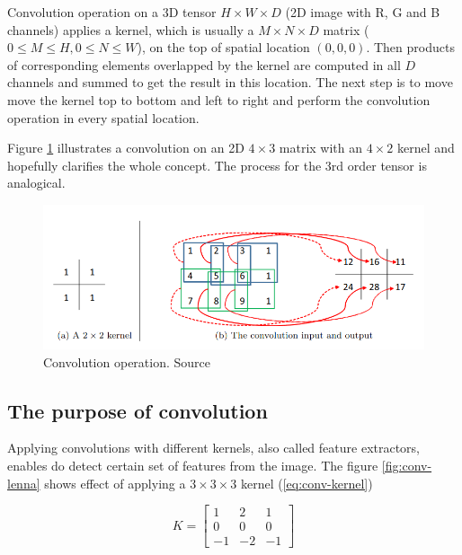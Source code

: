Convolution operation on a 3D tensor $H \times W \times D$ (2D image with R, G and B channels) applies a kernel, which is usually a $M \times N \times D$ matrix 
($0 \leq M \leq H, 0 \leq N \leq W$), on the top of spatial location $(0, 0, 0)$. Then products of corresponding elements overlapped by the kernel are computed in all $D$ channels and summed to get the result in this location. The next step is to move move the kernel top to bottom and left to right and perform the convolution operation in every spatial location.

Figure \ref{fig:conv-example} illustrates a convolution on an 2D $4 \times 3$ matrix with an $4 \times 2$ kernel and hopefully clarifies the whole concept. The process for the 3rd order tensor is analogical.

\begin{figure}[h]
    \centering
    \includegraphics[width=14cm]{img/ConvExample.png}
    \caption{Convolution operation. Source \cite{Wu2017IntroductionTC}}
    \label{fig:conv-example}
\end{figure}

\subsection{The purpose of convolution}
\label{sub:purpose-of-convolution}

Applying convolutions with different kernels, also called feature extractors, enables do detect certain set of features from the image. The figure \ref{fig:conv-lenna} shows effect of applying a $3 \times 3 \times 3$ kernel (\ref{eq:conv-kernel})

\begin{equation}
    K = \begin{bmatrix}
            1 & 2 & 1 \\
            0 & 0 & 0 \\
            -1 & -2 & -1
        \end{bmatrix}
    \label{eq:conv-kernel}
\end{equation}

